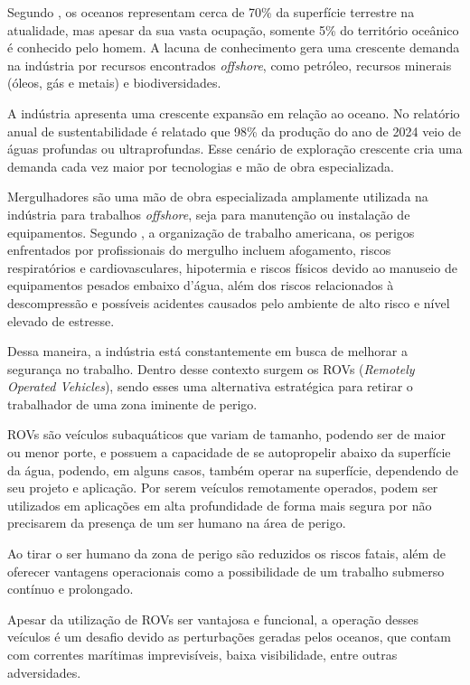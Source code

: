\documentclass[../main.tex]{subfiles}
\begin{document}
Segundo \textcite{biazon2017profundezas}, os oceanos representam cerca de 70\% da superfície terrestre na atualidade, mas apesar da sua vasta ocupação, somente 5\% do território oceânico é conhecido pelo homem. A lacuna de conhecimento gera uma crescente demanda na indústria por recursos encontrados \textit{offshore}, como petróleo, recursos minerais (óleos, gás e metais) e biodiversidades.

A indústria apresenta uma crescente expansão em relação ao oceano. No relatório anual de sustentabilidade \cite{petrobras2024} é relatado que 98\% da produção do ano de 2024 veio de águas profundas ou ultraprofundas. Esse cenário de exploração crescente cria uma demanda cada vez maior por tecnologias e mão de obra especializada.

Mergulhadores são uma mão de obra especializada amplamente utilizada na indústria para trabalhos \textit{offshore}, seja para manutenção ou instalação de equipamentos. Segundo \cite{OSHA2023}, a organização de trabalho americana, os perigos enfrentados por profissionais do mergulho incluem afogamento, riscos respiratórios e cardiovasculares, hipotermia e riscos físicos devido ao manuseio de equipamentos pesados embaixo d'água, além dos riscos relacionados à descompressão e possíveis acidentes causados pelo ambiente de alto risco e nível elevado de estresse.

Dessa maneira, a indústria está constantemente em busca de melhorar a segurança no trabalho. Dentro desse contexto surgem os ROVs (\textit{Remotely Operated Vehicles}), sendo esses uma alternativa estratégica para retirar o trabalhador de uma zona iminente de perigo.

ROVs são veículos subaquáticos que variam de tamanho, podendo ser de maior ou menor porte, e possuem a capacidade de se autopropelir abaixo da superfície da água, podendo, em alguns casos, também operar na superfície, dependendo de seu projeto e aplicação. Por serem veículos remotamente operados, podem ser utilizados em aplicações em alta profundidade de forma mais segura por não precisarem da presença de um ser humano na área de perigo.

Ao tirar o ser humano da zona de perigo são reduzidos os riscos fatais, além de oferecer vantagens operacionais como a possibilidade de um trabalho submerso contínuo e prolongado.

Apesar da utilização de ROVs ser vantajosa e funcional, a operação desses veículos é um desafio devido as perturbações geradas pelos oceanos, que contam com correntes marítimas imprevisíveis, baixa visibilidade, entre outras adversidades. 
\end{document}
